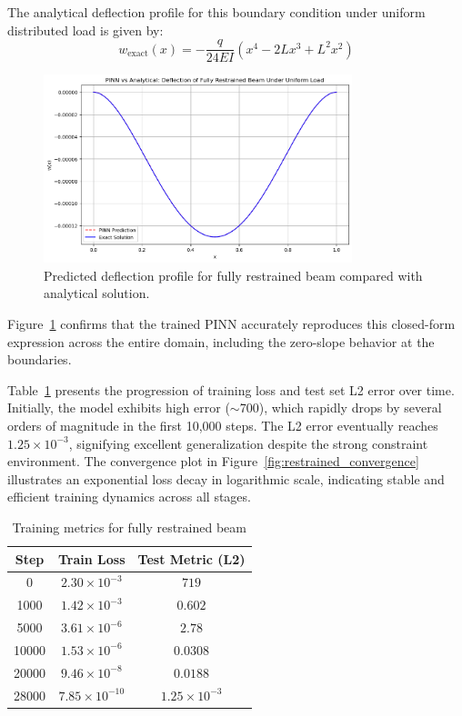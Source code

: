 \documentclass[twocolumn]{svjour3}
\begin{document}
	The analytical deflection profile for this boundary condition under uniform distributed load is given by:
	\begin{equation}
		w_{\text{exact}}(x) = -\frac{q}{24EI}(x^4 - 2Lx^3 + L^2x^2)
				\label{eq:117}
	\end{equation}
	
	\begin{figure}[htbp]
		\centering
		\includegraphics[width=0.8\textwidth]{restrained_results.png}
		\caption{Predicted deflection profile for fully restrained beam compared with analytical solution.}\label{fig:restrained_results}
	\end{figure}
	
	Figure~\ref{fig:restrained_results} confirms that the trained PINN accurately reproduces this closed-form expression across the entire domain, including the zero-slope behavior at the boundaries.
	
	Table~\ref{tab:restrained_convergence} presents the progression of training loss and test set L2 error over time. Initially, the model exhibits high error ($\sim$700), which rapidly drops by several orders of magnitude in the first 10,000 steps. The L2 error eventually reaches $1.25 \times 10^{-3}$, signifying excellent generalization despite the strong constraint environment. The convergence plot in Figure~\ref{fig:restrained_convergence} illustrates an exponential loss decay in logarithmic scale, indicating stable and efficient training dynamics across all stages.
	
	\begin{table}[htbp]
		\centering
		\caption{Training metrics for fully restrained beam}
		\begin{tabular}{c c c}
			\toprule
			\textbf{Step} & \textbf{Train Loss} & \textbf{Test Metric (L2)} \\
			\midrule
			0 & $2.30 \times 10^{-3}$ & $719$ \\
			1000 & $1.42 \times 10^{-3}$ & $0.602$ \\
			5000 & $3.61 \times 10^{-6}$ & $2.78$ \\
			10000 & $1.53 \times 10^{-6}$ & $0.0308$ \\
			20000 & $9.46 \times 10^{-8}$ & $0.0188$ \\
			28000 & $7.85 \times 10^{-10}$ & $1.25 \times 10^{-3}$ \\
			\bottomrule
		\end{tabular}\label{tab:restrained_convergence}
	\end{table}
	
\end{document}
